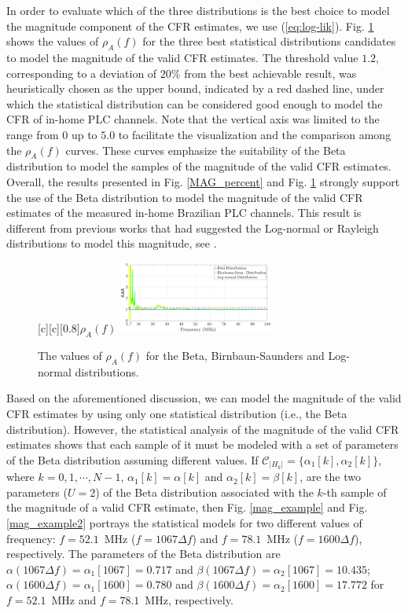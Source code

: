 \documentclass[journal]{IEEEtran}
\begin{document}
In order to evaluate which of the three distributions is the best choice to model the magnitude component of the \ac{CFR} estimates, we use (\ref{eq:log-lik}). Fig. \ref{fig:Log_like} shows the values of $\rho_{A}(f)$ for the three best statistical distributions candidates to model the magnitude of the valid \ac{CFR} estimates. The threshold value $1.2$, corresponding to a deviation of $20\%$ from the best achievable result, was heuristically chosen as the upper bound, indicated by a red dashed line, under which the statistical distribution can be considered good enough to model the \ac{CFR} of in-home \ac{PLC} channels. Note that the vertical axis was limited to the range from $0$ up to $5.0$ to facilitate the visualization and the comparison among the $\rho_{A} (f)$ curves. These curves emphasize the suitability of the Beta distribution to model the samples of the magnitude of the valid \ac{CFR} estimates. Overall, the results presented in Fig. \ref{MAG_percent} and Fig. \ref{fig:Log_like} strongly support the use of the Beta distribution to model the magnitude of the valid \ac{CFR} estimates of the measured in-home Brazilian \ac{PLC} channels. This result is different from previous works that had suggested the Log-normal or Rayleigh distributions to model this magnitude, see \cite{Galli:Wireline,RayleighPLC}.

\begin{figure}[h!]
	\centering
	[c][0.8]{$\rho_{A} (f)$}
	\includegraphics[width=0.45\textwidth]{images/LLH_BETA_BIRN_LogN_1.7.eps}
	\caption{The values of $\rho_{A} (f)$ for the Beta, Birnbaun-Saunders and Log-normal distributions.}
	\label{fig:Log_like}
\end{figure}

Based on the aforementioned discussion, we can model the magnitude of the valid \ac{CFR} estimates by using only one statistical distribution (i.e., the Beta distribution). However, the statistical analysis of the magnitude of the valid \ac{CFR} estimates shows that each sample of it must be modeled with a set of parameters of the Beta distribution assuming different values. If $\mathcal{C}_{|H_k|} = \{\alpha_{1}[k],\alpha_{2}[k]\}$, where $k=0,1,\cdots,N-1$,  $\alpha_{1}[k] = \alpha[k]$ and $\alpha_{2}[k] = \beta[k]$, are the two parameters ($U=2$) of the Beta distribution associated with the $k$-th sample of the magnitude of a valid \ac{CFR} estimate, then Fig. \ref{mag_example} and Fig. \ref{mag_example2} portrays the statistical models for two different values of frequency: $f=52.1$~MHz ($f = 1067\Delta f$) and $f=78.1$~MHz ($f = 1600\Delta f$), respectively. The parameters of the Beta distribution are  $\alpha(1067 \Delta f) = \alpha_{1}[1067]=0.717$ and $\beta( 1067 \Delta f) = \alpha_{2}[1067] = 10.435$; $\alpha(1600 \Delta f) = \alpha_{1}[1600] = 0.780$ and $\beta( 1600 \Delta f) = \alpha_{2}[1600]=17.772$ for $f=52.1$~MHz and $f=78.1$~MHz, respectively.
\end{document}
